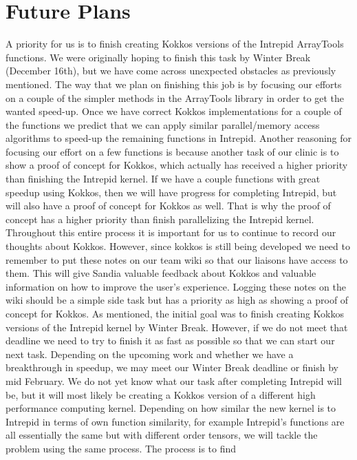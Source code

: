 \documentclass{hmcclinic}
\begin{document}
\section*{Future Plans}
A priority for us is to finish creating Kokkos versions of the Intrepid ArrayTools functions. 
We were originally hoping to finish this task by Winter Break (December 16th), but we have 
come across unexpected obstacles as previously mentioned. The way that we plan on finishing 
this job is by focusing our efforts on a couple of the simpler methods in the ArrayTools library 
in order to get the wanted speed-up. Once we have correct Kokkos implementations for a couple of
the functions we predict that we can apply similar parallel/memory access algorithms to speed-up
the remaining functions in Intrepid. Another reasoning for focusing our effort on a few functions
is because another task of our clinic is to show a proof of concept for Kokkos, which actually
has received a higher priority than finishing the Intrepid kernel. If we have a couple functions 
with great speedup using Kokkos, then we will have progress for completing Intrepid, but will also 
have a proof of concept for Kokkos as well. That is why the proof of concept has a higher priority 
than finish parallelizing the Intrepid kernel. Throughout this entire process it is important for 
us to continue to record our thoughts about Kokkos. However, since kokkos is still being developed
we need to remember to put these notes on our team wiki so that our liaisons have access to them. 
This will give Sandia valuable feedback about Kokkos and valuable information on how to improve the
user's experience. Logging these notes on the wiki should be a simple side task but has a priority
as high as showing a proof of concept for Kokkos. As mentioned, the initial goal was to finish 
creating Kokkos versions of the Intrepid kernel by Winter Break. However, if we do not meet that 
deadline we need to try to finish it as fast as possible so that we can start our next task. 
Depending on the upcoming work and whether we have a breakthrough in speedup, we may meet our 
Winter Break deadline or finish by mid February. We do not yet know what our task after completing
Intrepid will be, but it will most likely be creating a Kokkos version of a different high 
performance computing kernel. Depending on how similar the new kernel is to Intrepid in terms of
own function similarity, for example Intrepid's functions are all essentially the same but with 
different order tensors, we will tackle the problem using the same process. The process is to find
\end{document}
